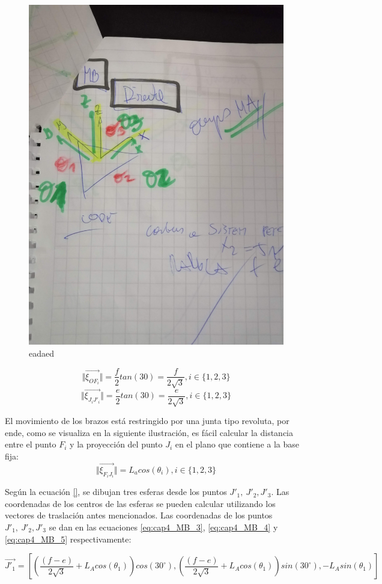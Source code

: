             \begin{figure}[htb]
                 \centering
               \includegraphics[width=0.2\linewidth]{Main/Chapter4/Images4/mb_direct.jpg}
               \caption{eadaed}
            \end{figure}
            
    \begin{equation}
        \Vert \overrightarrow{\xi_{OF_i}} \Vert=\frac{f}{2}tan(30)=\frac{f}{2\sqrt{3}} , i \in \{1,2,3\}
    \end{equation}
    \begin{equation}
        \Vert \overrightarrow{\xi_{J_iJ'_i}} \Vert=\frac{e}{2}tan(30)=\frac{e}{2\sqrt{3}} , i \in \{1,2,3\}
    \end{equation}
    
    El movimiento de los brazos está restringido por una junta tipo revoluta, por ende, como se visualiza en la siguiente ilustración, es fácil calcular la distancia entre el punto $F_i$ y la proyección del punto $J_i$ en el plano que contiene a la base fija:
    \begin{equation}
        \Vert \overrightarrow{\xi_{F_iJ_i}} \Vert=L_a cos(\theta_i) , i \in \{1,2,3\}
    \end{equation}
    
    \newpage
    
    Según la ecuación \ref{}, se dibujan tres esferas desde los puntos \( J'_{1},~J'_{2},J'_{3} \). Las coordenadas de los centros de las esferas se pueden calcular utilizando los vectores de traslación antes mencionados. Las coordenadas de los puntos \( J'_{1},~J'_{2},J'_{3} \) se dan en las ecuaciones \ref{eq:cap4_MB_3}, \ref{eq:cap4_MB_4} y \ref{eq:cap4_MB_5} respectivamente:

  
          \begin{equation}
                \overrightarrow{J'_{1}}= \left [\left( \frac{(f-e)}{2\sqrt{3}}+{L}_{A}cos(\theta_1)\right) cos(30^\circ), \left(\frac{(f-e)}{2\sqrt{3}} + {L}_{A}cos(\theta_1)\right) sin(30^\circ), -L_{A}sin(\theta_1)\right]
        \label{eq:cap4_MB_3}
        \end{equation}    
        
